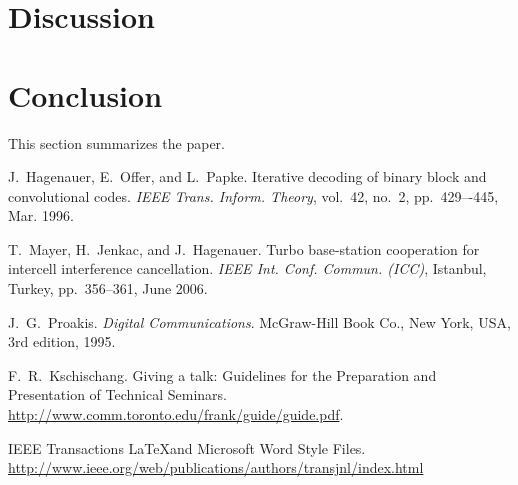 \documentclass[journal, a4paper]{IEEEtran}
\begin{document}
\section{Discussion}



\section{Conclusion}
    This section summarizes the paper.

\begin{thebibliography}{5}

    J.~Hagenauer, E.~Offer, and L.~Papke. Iterative decoding of binary block
    and convolutional codes. {\em IEEE Trans. Inform. Theory},
    vol.~42, no.~2, pp.~429–-445, Mar. 1996.

    T.~Mayer, H.~Jenkac, and J.~Hagenauer. Turbo base-station cooperation for intercell interference cancellation. {\em IEEE Int. Conf. Commun. (ICC)}, Istanbul, Turkey, pp.~356--361, June 2006.

    J.~G.~Proakis. {\em Digital Communications}. McGraw-Hill Book Co.,
    New York, USA, 3rd edition, 1995.

    F.~R.~Kschischang. Giving a talk: Guidelines for the Preparation and Presentation of Technical Seminars.
    \url{http://www.comm.toronto.edu/frank/guide/guide.pdf}.

    IEEE Transactions \LaTeX and Microsoft Word Style Files.
    \url{http://www.ieee.org/web/publications/authors/transjnl/index.html}

\end{thebibliography}

\end{document}
